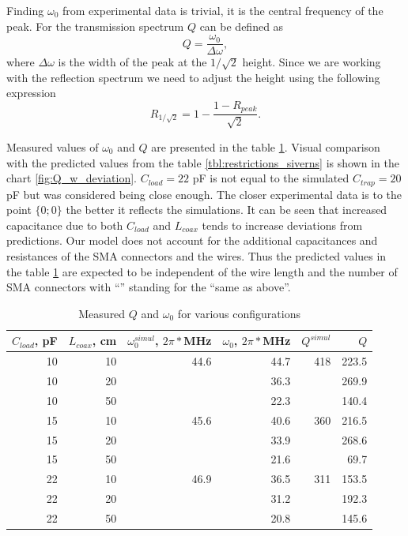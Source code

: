 \FloatBarrier
Finding $\omega_0$ from experimental data is trivial, it is the central frequency of the peak. For the transmission spectrum $Q$ can be defined as
\begin{equation}
	Q = \frac{\omega_0}{\Delta \omega},
\end{equation}
where $\Delta \omega$ is the width of the peak at the $1/\sqrt{2}$ height. Since we are working with the reflection spectrum we need to adjust the height using the following expression
\begin{equation}
	R_{1/\sqrt{2}} = 1 - \frac{1 - R_{peak}}{\sqrt{2}}.
	\label{eq:reflection_height}
\end{equation}

Measured values of $\omega_0$ and $Q$ are presented in the table \ref{tbl:Q_w_results}. Visual comparison with the predicted values from the table \ref{tbl:restrictions_siverns} is shown in the chart \ref{fig:Q_w_deviation}. $C_{load} = 22$ pF is not equal to the simulated $C_{trap} = 20$ pF but was considered being close enough. The closer experimental data is to the point $\{0; 0\}$ the better it reflects the simulations. It can be seen that increased capacitance due to both $C_{load}$ and $L_{coax}$ tends to increase deviations from predictions. Our model does not account for the additional capacitances and resistances of the SMA connectors and the wires. Thus the predicted values in the table \ref{tbl:Q_w_results} are expected to be independent of the wire length and the number of SMA connectors with ``\dittotikz'' standing for the ``same as above''.
\begin{table}[h]
\centering
\begin{tabular}{| r | r || r | r || r | r |}
	\hline
	$C_{load}$, pF & $L_{coax}$, cm & $\omega^{simul}_0$, $2\pi*$MHz & $\omega_0$, $2\pi*$MHz & $Q^{simul}$ & $Q$\\
	\hline \hline
	10 & 10 & 44.6 & 44.7 & 418 & 223.5\\
	\hline
	10 & 20 & \dittotikz & 36.3 & \dittotikz & 269.9\\
	\hline
	10 & 50 & \dittotikz & 22.3 & \dittotikz & 140.4\\
	\hline
	15 & 10 & 45.6 & 40.6 & 360 & 216.5\\
	\hline
	15 & 20 & \dittotikz & 33.9 & \dittotikz & 268.6\\
	\hline
	15 & 50 & \dittotikz & 21.6 & \dittotikz & 69.7\\
	\hline
	22 & 10 & 46.9 & 36.5 & 311 & 153.5\\
	\hline
	22 & 20 & \dittotikz & 31.2 & \dittotikz & 192.3\\
	\hline
	22 & 50 & \dittotikz & 20.8 & \dittotikz & 145.6\\
	\hline
\end{tabular}
\label{tbl:Q_w_results}
\caption{Measured $Q$ and $\omega_0$ for various configurations}
\end{table}

